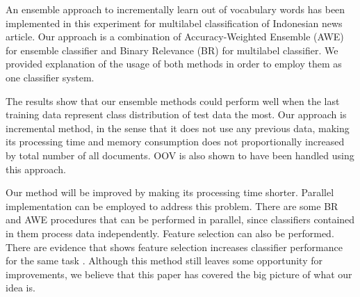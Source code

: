 \documentclass[conference]{IEEEtran}
\begin{document}
An ensemble approach to incrementally learn out of vocabulary words has been implemented in this experiment for multilabel classification of Indonesian news article.
Our approach is a combination of Accuracy-Weighted Ensemble (AWE) for ensemble classifier and Binary Relevance (BR) for multilabel classifier.
We provided explanation of the usage of both methods in order to employ them as one classifier system.

The results show that our ensemble methods could perform well when the last training data represent class distribution of test data the most.
Our approach is incremental method, in the sense that it does not use any previous data, making its processing time and memory consumption does not proportionally increased by total number of all documents.
OOV is also shown to have been handled using this approach.

Our method will be improved by making its processing time shorter.
Parallel implementation can be employed to address this problem.
There are some BR and AWE procedures that can be performed in parallel, since classifiers contained in them process data independently.
Feature selection can also be performed.
There are evidence that shows feature selection increases classifier performance for the same task \cite{rahma}.
Although this method still leaves some opportunity for improvements, we believe that this paper has covered the big picture of what our idea is.
\end{document}
